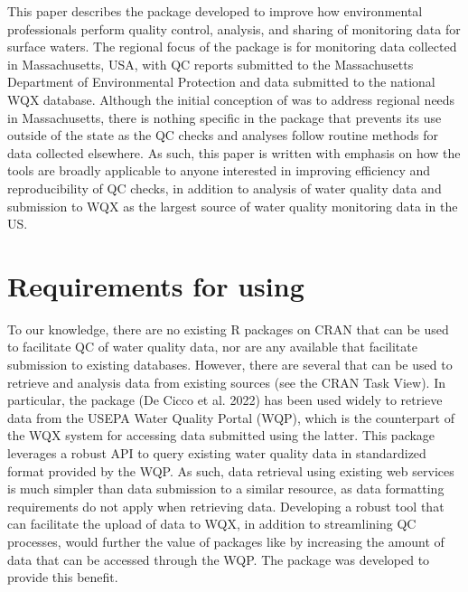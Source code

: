 This paper describes the  package developed to improve how environmental professionals perform quality control, analysis, and sharing of monitoring data for surface waters. The regional focus of the package is for monitoring data collected in Massachusetts, USA, with QC reports submitted to the Massachusetts Department of Environmental Protection and data submitted to the national WQX database. Although the initial conception of  was to address regional needs in Massachusetts, there is nothing specific in the package that prevents its use outside of the state as the QC checks and analyses follow routine methods for data collected elsewhere. As such, this paper is written with emphasis on how the tools are broadly applicable to anyone interested in improving efficiency and reproducibility of QC checks, in addition to analysis of water quality data and submission to WQX as the largest source of water quality monitoring data in the US.

\hypertarget{requirements-for-using}{%
\section{\texorpdfstring{Requirements for using }{Requirements for using }}\label{requirements-for-using}}

To our knowledge, there are no existing R packages on CRAN that can be used to facilitate QC of water quality data, nor are any available that facilitate submission to existing databases. However, there are several that can be used to retrieve and analysis data from existing sources (see the CRAN  Task View). In particular, the  package (De Cicco et al. 2022) has been used widely to retrieve data from the USEPA Water Quality Portal (WQP), which is the counterpart of the WQX system for accessing data submitted using the latter. This package leverages a robust API to query existing water quality data in standardized format provided by the WQP. As such, data retrieval using existing web services is much simpler than data submission to a similar resource, as data formatting requirements do not apply when retrieving data. Developing a robust tool that can facilitate the upload of data to WQX, in addition to streamlining QC processes, would further the value of packages like  by increasing the amount of data that can be accessed through the WQP. The  package was developed to provide this benefit.

